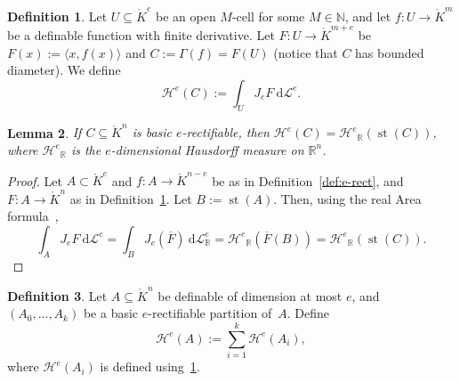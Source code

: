 \documentclass[a4paper, 12pt, final]{article}
\newtheorem{lem}{Lemma}[section]
\newtheorem{open problem}[lem]{Open problem}
\theoremstyle{remark}
\theoremstyle{definition}
\newtheorem{dfn}[lem]{Definition}
\newtheorem{final remark}[lem]{Final remark}
\begin{document}
\begin{dfn}\label{def:area-basic}
Let $U \subseteq {\mathring {K}}^e$ be an open $M$-cell for some $M \in {\mathbb{N}}$, and let
$f: U \to {\mathring {K}}^m$ be a definable function with  finite derivative.
Let $F: U \to {\mathring {K}}^{m+e}$ be $F(x) := {\langle {x, f(x)} \rangle}$ and
$C := \Gamma(f) = F(U)$ (notice that $C$ has bounded diameter).
We define
\[
{{\mathcal H}^{e}}(C) := \int_U {J}_e F {\:\mathrm d} {{\mathcal L}^e}.
\]
\end{dfn}

\begin{lem}\label{lem:Hausdorff-standard}
If $C \subseteq {\mathring {K}}^n$ is {basic $e$-rectifiable\xspace}, then ${\mathcal H}^e(C) = {{\mathcal H}^{e}}_{\mathbb{R}}(\operatorname{st}(C))$,
where ${{\mathcal H}^{e}}_{\mathbb{R}}$ is the $e$-dimensional Hausdorff measure on ${\mathbb{R}}^n$.
\end{lem}
\begin{proof}
Let $A \subset {\mathring {K}}^e$ and $f: A \to {\mathring {K}}^{n-e}$ be as in
Definition~\ref{def:e-rect}, and $F: A \to {\mathring {K}}^n$ as in Definition~\ref{def:area-basic}.
Let $B := \operatorname{st}(A)$.
Then, using the real Area formula~\cite{morgan},
\[
\int_A {J}_e F {\:\mathrm d} {{\mathcal L}^e} =
\int_B {J}_e ({\overline{F}})  {\:\mathrm d} {\mathcal L}^e_{\mathbb{R}} =
{{\mathcal H}^{e}}_{\mathbb{R}}({\overline{F}}(B)) =
{{\mathcal H}^{e}}_{\mathbb{R}}(\operatorname{st}(C)).
\]
\end{proof}

\begin{dfn}
Let $A \subseteq {\mathring {K}}^n$ be definable of dimension at most $e$, and $(A_0, \dotsc, A_k)$ be a {basic $e$-rectifiable\xspace}
partition of~$A$.
Define 
\[
{\mathcal H}^e(A) := \sum_{i = 1}^k {\mathcal H}^e(A_i),
\]
where  ${\mathcal H}^e(A_i)$ is defined using~\ref{def:area-basic}.
\end{dfn}
\end{document}
